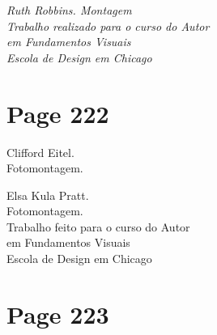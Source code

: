 \documentclass[a4paper]{article}
\begin{document}
\vspace{1.5em} %

\begin{flushright}
\itshape\small
Ruth Robbins. Montagem\\
Trabalho realizado para o curso do Autor\\
em Fundamentos Visuais\\
Escola de Design em Chicago
\end{flushright}

\vspace*{\fill} %

\newpage
\section*{Page 222}

Clifford Eitel.\\
Fotomontagem.

Elsa Kula Pratt.\\
Fotomontagem.\\
Trabalho feito para o curso do Autor\\
em Fundamentos Visuais\\
Escola de Design em Chicago

\vfill
{}

\newpage
\section*{Page 223}
\end{document}
